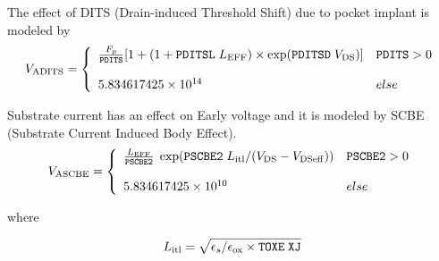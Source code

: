 \documentclass{article}
\begin{document}
\noindent The effect of DITS (Drain-induced Threshold Shift) due
to pocket implant is modeled by
\begin{equation}
V_{\rm{ADITS}} = \left\{\begin{array}{ll}
       {F_p \over \texttt{PDITS}} [1 + (1 + \texttt{PDITSL}\;L_{\rm{EFF}}) \times \exp(\texttt{PDITSD}\;V_{\rm{DS}})] & \texttt{PDITS} > 0 \\
                & \\
        5.834617425 \times 10^{14} & else
                            \end{array}
                    \right.
\end{equation}

\noindent Substrate current has an effect on Early voltage and it
is modeled by SCBE (Substrate Current Induced Body Effect).
\begin{equation}
V_{\rm{ASCBE}} = \left\{\begin{array}{ll}
       {L_{\rm{EFF}} \over \texttt{PSCBE2}} \; \exp(\texttt{PSCBE2} \;L_{\rm{itl}} / (V_{\rm{DS}} - V_{\rm{DSeff}})) & \texttt{PSCBE2} > 0 \\
       & \\
       5.834617425 \times 10^{10} & else
                            \end{array}
                    \right.
\end{equation}

\noindent where

\begin{equation}
L_{\rm{itl}} = \sqrt{\epsilon_{s}/\epsilon_{\rm{ox}} \times
\texttt{TOXE}\;\texttt{XJ}}
\end{equation}
\end{document}

